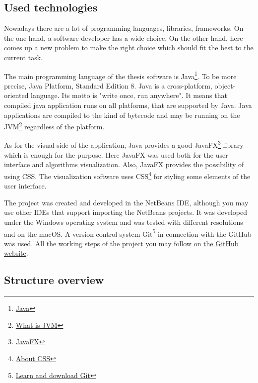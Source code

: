 \documentclass[
  field=inf,
  biblatex,
  language=english,
  glossaries,
  theorems=false,
  sourcecodes=false,
  index
]{kidiplom}
\begin{document}
\subsection{Used technologies}

Nowadays there are a lot of programming languages, libraries, frameworks. On the one hand, a software developer has a wide choice. On the other hand, here comes up a new problem to make the right choice which should fit the best to the current task.

The main programming language of the thesis software is Java\footnote{\href{https://docs.oracle.com/javase/tutorial/getStarted/intro/definition.html}{Java}}. To be more precise, Java Platform, Standard Edition 8. Java is a cross-platform, object-oriented language. Its motto is "write once, run anywhere". It means that compiled java application runs on all platforms, that are supported by Java. Java applications are compiled to the kind of bytecode and may be running on the \Gls{JVM}\footnote{\href{https://www.geeksforgeeks.org/jvm-works-jvm-architecture/}{What is JVM}} regardless of the platform. 

As for the visual side of the application, Java provides a good JavaFX\footnote{\href{https://docs.oracle.com/javase/8/javafx/get-started-tutorial/jfx-overview.htm}{JavaFX}} library which is enough for the purpose. Here JavaFX was used both for the user interface and algorithms visualization. Also, JavaFX provides the possibility of using \Gls{CSS}. The visualization software uses \Gls{CSS}\footnote{\href{https://www.w3schools.com/css/default.asp}{About CSS}} for styling some elements of the user interface.

The project was created and developed in the NetBeans IDE, although you may use other IDEs that support importing the NetBeans projects. It was developed under the Windows operating system and was tested with different resolutions and on the macOS. A version control system Git\footnote{\href{https://git-scm.com/}{Learn and download Git}} in connection with the GitHub was used. All the working steps of the project you may follow on \href{https://github.com/klnmi97/Sorting-Visualization}{the GitHub website}.

\newpage
\subsection{Structure overview}
\end{document}
